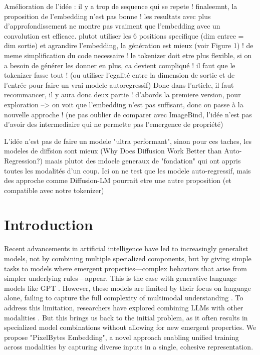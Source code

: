 \documentclass[10pt,a4paper]{article}
\begin{document}
Amélioration de l'idée : il y a trop de sequence qui se repete ! finaleemnt, la proposition de l'embedding n'est pas bonne ! les resultats avec plus d'approfondissement ne montre pas vraiment que l'embedding avec un convolution est efficace. plutot utiliser les 6 positions specifique (dim entree = dim sortie) et agrandire l'embedding, la génération est mieux (voir Figure 1) ! de meme simplification du code necessaire ! le tokenizer doit etre plus flexible, si on a besoin de générer les donner en plus, ca devient compliqué ! il faut que le tokenizer fasse tout ! (ou utiliser l'egalité entre la dimension de sortie et de l'entrée pour faire un vrai modele autoregressif) Donc dans l'article, il faut recommancer, il y aura donc deux partie ! d'abords la premiere version, pour exploration --> on voit que l'embedding n'est pas suffisant, donc on passe à la nouvelle approche ! (ne pas oublier de comparer avec ImageBind, l'idée n'est pas d'avoir des intermediaire qui ne permette pas l'emergence de propriété)

L'idée n'est pas de faire un modele "ultra performant", sinon pour ces taches, les modeles de diffsion sont mieux (Why Does Diffusion Work Better than Auto-Regression?) maais plutot des mdoele generaux de "fondation" qui ont appris toutes les modalités d'un coup. Ici on ne test que les modele auto-regressif, mais des approche comme Diffusion-LM pourrait etre une autre proposition (et compatible avec notre tokenizer)

\section{Introduction}

Recent advancements in artificial intelligence have led to increasingly generalist models, not by combining multiple specialized components, but by giving simple tasks to models where emergent properties—complex behaviors that arise from simpler underlying rules—appear. This is the case with generative language models like GPT \cite{brown2020language}. However, these models are limited by their focus on language alone, failing to capture the full complexity of multimodal understanding \cite{huang2023language}. To address this limitation, researchers have explored combining LLMs with other modalities \cite{liu2024visual}. But this brings us back to the initial problem, as it often results in specialized model combinations without allowing for new emergent properties. We propose "PixelBytes Embedding", a novel approach enabling unified training across modalities by capturing diverse inputs in a single, cohesive representation.
\end{document}
